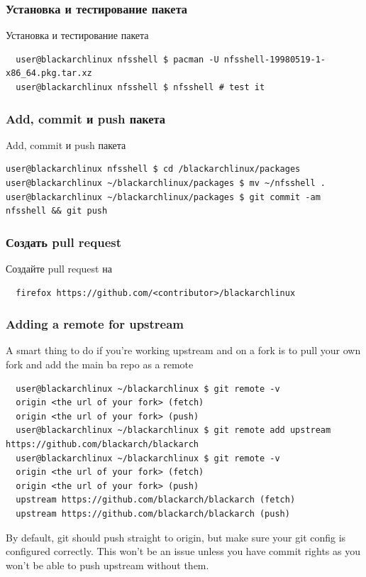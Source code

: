 \documentclass[a4paper, oneside, 11pt]{book}
\def\href#1#2{\htmladdnormallink{#2}{#1}}
\begin{document}
\subsubsection{Установка и тестирование пакета}
Установка и тестирование пакета
\begin{lstlisting}
  user@blackarchlinux nfsshell $ pacman -U nfsshell-19980519-1-x86_64.pkg.tar.xz
  user@blackarchlinux nfsshell $ nfsshell # test it
\end{lstlisting}

\subsubsection{Add, commit и push пакета}
Add, commit и push пакета 
\begin{lstlisting}user@blackarchlinux nfsshell $ cd /blackarchlinux/packages
user@blackarchlinux ~/blackarchlinux/packages $ mv ~/nfsshell .
user@blackarchlinux ~/blackarchlinux/packages $ git commit -am nfsshell && git push
\end{lstlisting}

\subsubsection{Создать pull request}
Создайте pull request на \href{https://github.com/}{github.com}
\begin{lstlisting}
  firefox https://github.com/<contributor>/blackarchlinux
\end{lstlisting}

\subsubsection{Adding a remote for upstream}
A smart thing to do if you're working upstream and on a fork is to pull your own fork and add the main ba repo as a remote
\begin{lstlisting}
  user@blackarchlinux ~/blackarchlinux $ git remote -v
  origin <the url of your fork> (fetch)
  origin <the url of your fork> (push)
  user@blackarchlinux ~/blackarchlinux $ git remote add upstream https://github.com/blackarch/blackarch
  user@blackarchlinux ~/blackarchlinux $ git remote -v
  origin <the url of your fork> (fetch)
  origin <the url of your fork> (push)
  upstream https://github.com/blackarch/blackarch (fetch)
  upstream https://github.com/blackarch/blackarch (push)
\end{lstlisting}

By default, git should push straight to origin, but make sure your git config is
configured correctly. This won't be an issue unless you have commit rights as
you won't be able to push upstream without them.
\end{document}
